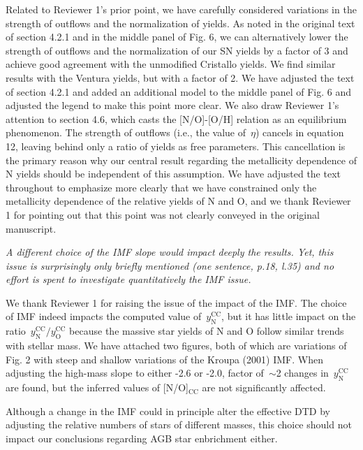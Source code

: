 \documentclass[12pt]{article}
\newcommand{\ycc}[1]{\ensuremath{y_\text{#1}^\text{CC}}}
\newcommand\doublebreak[0]{\par\null\par\noindent}
\begin{document}
\doublebreak
Related to Reviewer 1's prior point, we have carefully considered variations in
the strength of outflows and the normalization of yields.
As noted in the original text of section 4.2.1 and in the middle panel of Fig.
6, we can alternatively lower the strength of outflows and the normalization of
our SN yields by a factor of 3 and achieve good agreement with the unmodified
Cristallo yields.
We find similar results with the Ventura yields, but with a factor of 2.
We have adjusted the text of section 4.2.1 and added an additional model to the
middle panel of Fig. 6 and adjusted the legend to make this point more clear.
We also draw Reviewer 1's attention to section 4.6, which casts the [N/O]-[O/H]
relation as an equilibrium phenomenon.
The strength of outflows (i.e., the value of~$\eta$) cancels in equation 12,
leaving behind only a ratio of yields as free parameters.
This cancellation is the primary reason why our central result regarding the
metallicity dependence of N yields should be independent of this assumption.
We have adjusted the text throughout to emphasize more clearly that we have
constrained only the metallicity dependence of the relative yields of N and O,
and we thank Reviewer 1 for pointing out that this point was not clearly
conveyed in the original manuscript.
\doublebreak
\textit{%
A different choice of the IMF slope would impact deeply the results.
Yet, this issue is surprisingly only briefly mentioned (one sentence, p.18,
l.35) and no effort is spent to investigate quantitatively the IMF issue.
}
\doublebreak
We thank Reviewer 1 for raising the issue of the impact of the IMF.
The choice of IMF indeed impacts the computed value of~$\ycc{N}$, but it has
little impact on the ratio~$\ycc{N} / \ycc{O}$ because the massive star yields
of N and O follow similar trends with stellar mass.
We have attached two figures, both of which are variations of Fig. 2 with
steep and shallow variations of the Kroupa (2001) IMF.
When adjusting the high-mass slope to either -2.6 or -2.0, factor of~$\sim$2
changes in~$\ycc{N}$ are found, but the inferred values of [N/O]$_\text{CC}$
are not significantly affected.
\par
Although a change in the IMF could in principle alter the effective DTD by
adjusting the relative numbers of stars of different masses, this choice should
not impact our conclusions regarding AGB star enbrichment either.
\end{document}
